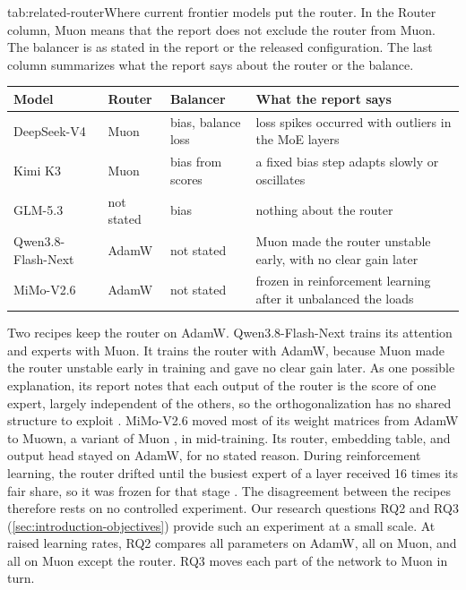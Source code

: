 \begin{table}[Where training recipes put the router]{tab:related-router}{Where current frontier models put the router. In the Router column, Muon means that the report does not exclude the router from Muon. The balancer is as stated in the report or the released configuration. The last column summarizes what the report says about the router or the balance.}
  \small
  \begin{tabular}{@{}lll>{\raggedright\arraybackslash}p{8.6cm}@{}}
    \toprule
    Model               & Router     & Balancer                  & What the report says                                                             \\
    \midrule
    DeepSeek-V4         & Muon       & bias, balance loss        & loss spikes occurred with outliers in the MoE layers                             \\
    Kimi K3             & Muon       & bias from scores          & a fixed bias step adapts slowly or oscillates                                    \\
    GLM-5.3             & not stated & bias                      & nothing about the router                                                         \\
    Qwen3.8-Flash-Next  & AdamW      & not stated                & Muon made the router unstable early, with no clear gain later                    \\
    MiMo-V2.6           & AdamW      & not stated                & frozen in reinforcement learning after it unbalanced the loads                  \\
    \bottomrule
  \end{tabular}
\end{table}

Two recipes keep the router on AdamW\@. Qwen3.8-Flash-Next trains its attention and experts with Muon. It trains the router with AdamW, because Muon made the router unstable early in training and gave no clear gain later. As one possible explanation, its report notes that each output of the router is the score of one expert, largely independent of the others, so the orthogonalization has no shared structure to exploit \cite{qiu2026qwennext}. MiMo-V2.6 moved most of its weight matrices from AdamW to Muown, a variant of Muon \cite{lion2026muown}, in mid-training. Its router, embedding table, and output head stayed on AdamW, for no stated reason. During reinforcement learning, the router drifted until the busiest expert of a layer received 16 times its fair share, so it was frozen for that stage \cite{xiaomi2026mimov26}. The disagreement between the recipes therefore rests on no controlled experiment. Our research questions RQ2 and RQ3 (\cref{sec:introduction-objectives}) provide such an experiment at a small scale. At raised learning rates, RQ2 compares all parameters on AdamW, all on Muon, and all on Muon except the router. RQ3 moves each part of the network to Muon in turn.


